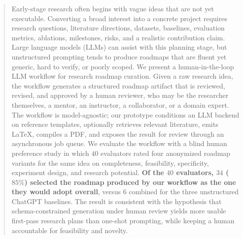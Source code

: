 \documentclass{article}
\begin{document}

\printAffiliationsAndNotice{}

\begin{abstract}
Early-stage research often begins with vague ideas that are not yet
executable. Converting a broad interest into a concrete project requires
research questions, literature directions, datasets, baselines, evaluation
metrics, ablations, milestones, risks, and a realistic contribution claim.
Large language models (LLMs) can assist with this planning stage, but unstructured
prompting tends to produce roadmaps that are fluent yet generic, hard to
verify, or poorly scoped. We present a human-in-the-loop LLM workflow for
research roadmap curation. Given a raw research idea, the workflow generates
a structured roadmap artifact that is reviewed, revised, and approved by a
human reviewer, who may be the researcher themselves, a mentor, an
instructor, a collaborator, or a domain expert. The workflow is
model-agnostic; our prototype conditions an LLM backend on reference
templates, optionally retrieves relevant literature, emits LaTeX, compiles
a PDF, and exposes the result for review through an asynchronous job queue.
We evaluate the workflow with a blind human preference study in which $40$
evaluators rated four anonymized roadmap variants for the same idea on
completeness, feasibility, specificity, experiment design, and research
potential. \textbf{Of the $40$ evaluators, $34$ ($85\%$) selected the
roadmap produced by our workflow as the one they would adopt overall},
versus $6$ combined for the three unstructured ChatGPT baselines. The
result is consistent with the hypothesis that schema-constrained generation
under human review yields more usable first-pass research plans than
one-shot prompting, while keeping a human accountable for feasibility and
novelty.
\end{abstract}
\end{document}
